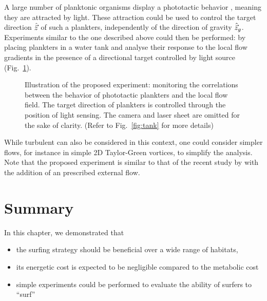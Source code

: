 A large number of planktonic organisms display a phototactic behavior \citep{tranter1981nocturnal, wilhelmus2014observations}, meaning they are attracted by light.
These attraction could be used to control the target direction $\hat{\vec{z}}$ of such a plankters, independently of the direction of gravity $\hat{\vec{z}}_g$.
Experiments similar to the one described above could then be performed: by placing plankters in a water tank and analyse their response to the local flow gradients in the presence of a directional target controlled by light source (Fig.~\ref{fig:phototactic_tank}).
\begin{figure}%
	\centering
	\def\svgwidth{0.9\textwidth}
	
	\caption[Illustration of the proposed experiment: monitoring the correlations between the behavior of phototactic plankters and the local flow field.]{
		Illustration of the proposed experiment: monitoring the correlations between the behavior of phototactic plankters and the local flow field.
		The target direction of plankters is controlled through the position of light sensing.
		The camera and laser sheet are omitted for the sake of clarity. (Refer to Fig.~\ref{fig:tank} for more details)
	}
	\label{fig:phototactic_tank}
\end{figure}

While turbulent can also be considered in this context, one could consider simpler flows, for instance in simple 2D Taylor-Green vortices, to simplify the analysis.
Note that the proposed experiment is similar to that of the recent study by \citet{houghton2018vertically} with the addition of an prescribed external flow.

\section{Summary}

In this chapter, we demonstrated that
\begin{itemize}
	\item the surfing strategy should be beneficial over a wide range of habitats,
	\item its energetic cost is expected to be negligible compared to the metabolic cost
	\item simple experiments could be performed to evaluate the ability of surfers to ``surf''
\end{itemize}
